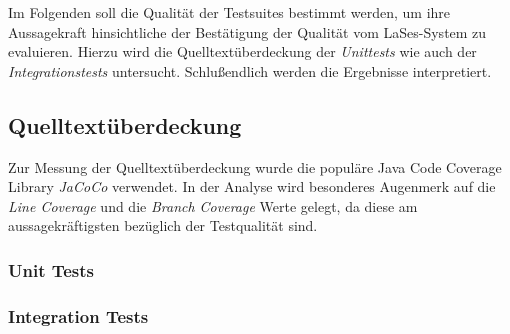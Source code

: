 
Im Folgenden soll die Qualität der Testsuites bestimmt werden,
um ihre Aussagekraft hinsichtliche der Bestätigung der Qualität vom LaSes-System zu evaluieren.
Hierzu wird die Quelltextüberdeckung der \emph{Unittests} wie auch der \emph{Integrationstests} untersucht.
Schlußendlich werden die Ergebnisse interpretiert.

\subsection{Quelltextüberdeckung}\label{subsec:quelltextueberdeckung}
Zur Messung der Quelltextüberdeckung wurde die populäre Java Code Coverage Library \emph{JaCoCo} verwendet.
In der Analyse wird besonderes Augenmerk auf die \emph{Line Coverage} und die \emph{Branch Coverage} Werte gelegt,
da diese am aussagekräftigsten bezüglich der Testqualität sind.

\subsubsection{Unit Tests}

\subsubsection{Integration Tests}
